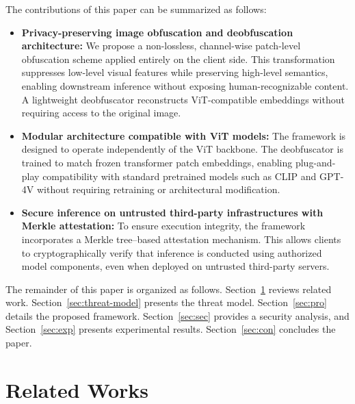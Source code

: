 \documentclass{ieeeaccess}
\newcommand{\rev}[1]{{\color{black}#1}}
\begin{document}
The contributions of this paper can be summarized as follows:
\begin{itemize}
    \item \rev{\textbf{Privacy-preserving image obfuscation and deobfuscation architecture:} We propose a non-lossless, channel-wise patch-level obfuscation scheme applied entirely on the client side. This transformation suppresses low-level visual features while preserving high-level semantics, enabling downstream inference without exposing human-recognizable content. A lightweight deobfuscator reconstructs ViT-compatible embeddings without requiring access to the original image.}
    \item \textbf{Modular architecture compatible with ViT models:} The framework is designed to operate independently of the ViT backbone. The deobfuscator is trained to match frozen transformer patch embeddings, enabling plug-and-play compatibility with standard pretrained models such as CLIP and GPT-4V without requiring retraining or architectural modification.
    \item \textbf{Secure inference on untrusted third-party infrastructures with Merkle attestation:} To ensure execution integrity, the framework incorporates a Merkle tree--based attestation mechanism. This allows clients to cryptographically verify that inference is conducted using authorized model components, even when deployed on untrusted third-party servers.
\end{itemize}

The remainder of this paper is organized as follows. Section~\ref{sec:rel} reviews related work. Section~\ref{sec:threat-model} presents the threat model. Section~\ref{sec:pro} details the proposed framework. Section~\ref{sec:sec} provides a security analysis, and Section~\ref{sec:exp} presents experimental results. Section~\ref{sec:con} concludes the paper.

\section{Related Works} \label{sec:rel}
\end{document}
